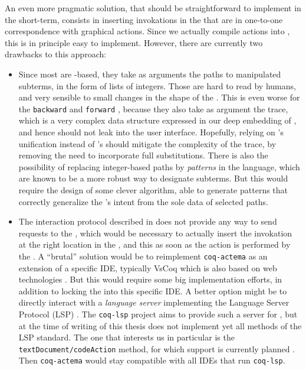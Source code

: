 An even more pragmatic solution, that should be straightforward to implement in
the short-term, consists in inserting  invokations in the 
that are in one-to-one correspondence with graphical actions. Since we actually
compile actions into , this is in principle easy to implement. However,
there are currently two drawbacks to this approach:
\begin{itemize}
  \item Since most  are -based, they take as arguments the
  paths to manipulated subterms, in the form of lists of integers. Those are
  hard to read by humans, and very sensible to small changes in the shape of the
  . This is even worse for the \texttt{backward} and \texttt{forward}
  , because they also take as argument the  trace,
  which is a very complex data structure expressed in our deep embedding of
  , and hence should not leak into the user interface.
  Hopefully, relying on 's unification instead of 's should mitigate
  the complexity of the trace, by removing the need to incorporate full
  substitutions. There is also the possibility of replacing integer-based paths
  by \emph{patterns} in the {\ssreflect} language, which are known to be a more
  robust way to designate subterms. But this would require the design of some
  clever algorithm, able to generate patterns that correctly generalize the
  's intent from the sole data of selected paths.

  \item The interaction protocol described in  does not provide
  any way to send requests to the , which would be necessary to
  actually insert the  invokation at the right location in the , and this as soon as the action is performed by the . A
  ``brutal'' solution would be to reimplement \texttt{coq-actema} as an
  extension of a specific IDE, typically VsCoq which is also based on web
  technologies \cite{VsCoq}. But this would require some big implementation
  efforts, in addition to locking the  into this specific IDE. A
  better option might be to directly interact with a \emph{language server}
  implementing the Language Server Protocol (LSP) \cite{LSP}. The
  \texttt{coq-lsp} project aims to provide such a server for , but at the
  time of writing of this thesis does not implement yet all methods of the LSP
  standard. The one that interests us in particular is the
  \texttt{textDocument/codeAction} method, for which support is currently
  planned \cite{coq-lsp-proto}. Then \texttt{coq-actema} would stay compatible
  with all IDEs that run \texttt{coq-lsp}.
\end{itemize}